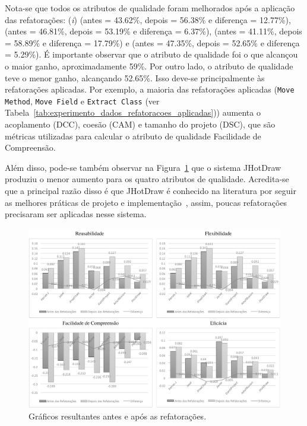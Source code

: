 Nota-se que todos os atributos de qualidade foram melhorados após a aplicação das refatorações: (\textit{i})  (antes = 43.62\%, depois = 56.38\% e diferença = 12.77\%),  (antes = 46.81\%, depois = 53.19\% e diferença = 6.37\%),  (antes = 41.11\%, depois = 58.89\% e diferença = 17.79\%) e  (antes = 47.35\%, depois = 52.65\% e diferença = 5.29\%).
É importante observar que o atributo de qualidade  foi o que alcançou o maior ganho, aproximadamente 59\%. Por outro lado, o atributo de qualidade  teve o menor ganho, alcançando  52.65\%. Isso deve-se principalmente às refatorações aplicadas. Por exemplo, a maioria das refatorações aplicadas (\texttt{Move Method}, \texttt{Move Field} e \texttt{Extract Class} (ver Tabela~\ref{tab:experimento_dados_refatoracoes_aplicadas})) aumenta o acoplamento (DCC), coesão (CAM) e tamanho do projeto (DSC), que são métricas utilizadas para calcular o atributo de qualidade Facilidade de Compreensão.

Além disso, pode-se também observar na Figura~\ref{fig:barchartRefactoringBeforeAndAfter} que o sistema JHotDraw produziu o menor aumento para os quatro atributos de qualidade. Acredita-se que a principal razão disso é que JHotDraw é conhecido na literatura por seguir as melhores práticas de projeto e implementação~\cite{Kessentini_2010}, assim, poucas refatorações precisaram ser aplicadas nesse sistema.


\begin{figure}[h]
	\centering
	\caption{Gráficos resultantes antes e após as refatorações.}
	\label{fig:barchartRefactoringBeforeAndAfter}
	\includegraphics[scale=0.7]{images/GraficoDeBarraTodasDia140116}
	\fautor
\end{figure}



